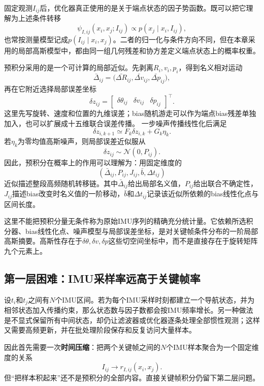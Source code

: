 固定观测$I_{ij}$后，优化器真正使用的是关于端点状态的因子势函数。既可以把它理解为上述条件转移
\[
    \psi_{I,ij}(x_i,x_j;I_{ij})
    \propto p(x_j\mid x_i,I_{ij}),
\]
也常按测量模型记成$p(I_{ij}\mid x_i,x_j)$。二者的归一化与条件方向不同，但在本章采用的局部高斯模型中，都由同一组几何残差和协方差定义端点状态上的概率权重。

预积分采用的是一个可计算的局部近似。先剥离$R_i,v_i,p_i$，得到名义相对运动
\[
    \bar\Delta_{ij}
    =\bigl(
      \bar{\Delta R}_{ij},
      \bar{\Delta v}_{ij},
      \bar{\Delta p}_{ij}
    \bigr),
\]
再在它附近选择局部误差坐标
\[
    \delta z_{ij}
    =\begin{bmatrix}
       \delta\theta_{ij}&\delta v_{ij}&\delta p_{ij}
     \end{bmatrix}^\top.
\]
这里先写旋转、速度和位置的九维误差；bias随机游走可以作为端点bias残差单独加入，也可以扩展成十五维联合误差传播。
一步噪声传播线性化后满足
\[
    \delta z_{i,k+1}
    \simeq F_k\delta z_{i,k}+G_k\eta_k.
\]
若$\eta_k$为零均值高斯噪声，则局部误差近似服从
\[
\boxed{
    \delta z_{ij}\sim\mathcal N(0,P_{ij}).
}
\]
因此，预积分在概率上的作用可以理解为：用固定维度的
\[
\boxed{
    \left(
      \bar\Delta_{ij},
      P_{ij},
      J_{ij},
      \bar b,
      \Delta t_{ij}
    \right)
}
\]
近似描述整段高频随机转移链。其中$\bar\Delta_{ij}$给出局部名义值，$P_{ij}$给出联合不确定性，$J_{ij}$描述bias改变时名义值的一阶移动，$\bar b$和$\Delta t_{ij}$记录该近似所依赖的bias线性化点与区间长度。

这里不能把预积分量无条件称为原始IMU序列的精确充分统计量。它依赖所选积分器、bias线性化点、噪声模型与局部误差坐标，是对关键帧条件分布的一阶局部高斯摘要。高斯性存在于$\delta\theta,\delta v,\delta p$这些切空间坐标中，而不是直接存在于旋转矩阵九个元素上。

\subsection{第一层困难：IMU采样率远高于关键帧率}

设$t_i$和$t_j$之间有$N$个IMU区间。若为每个IMU采样时刻都建立一个导航状态，并为相邻状态加入传播约束，那么状态数与因子数都会按IMU频率增长。另一种做法是不显式保留所有中间状态，却仍让滤波器或优化器逐条处理全部惯性观测；这样又需要高频更新，并在批处理阶段保存和反复访问大量样本。

因此首先需要一次\textbf{时间压缩}：把两个关键帧之间的$N$个IMU样本聚合为一个固定维度的关系
\[
    I_{ij}
    \longrightarrow
    r_{I,ij}(x_i,x_j).
\]
但“把样本积起来”还不是预积分的全部内容。直接关键帧积分仍留下第二层问题。

